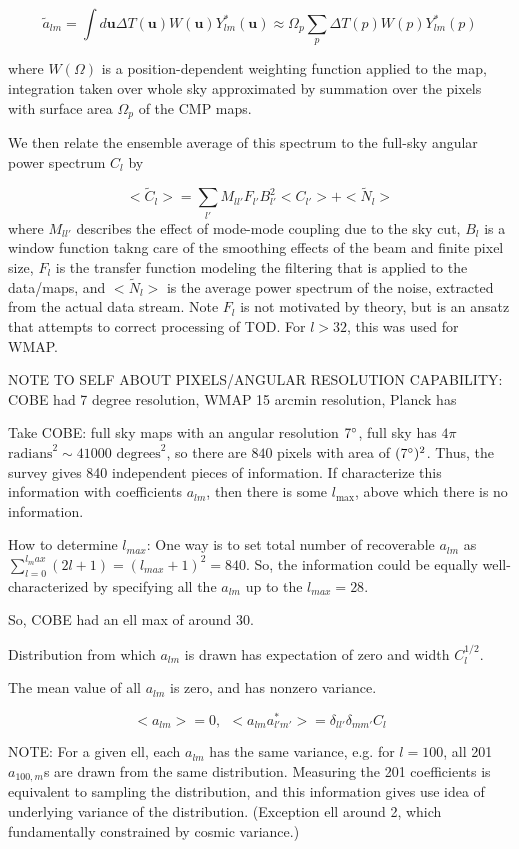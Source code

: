 \documentclass[a4paper, 11pt]{article}
\begin{document}
$$
\tilde{a}_{lm}=\int d\textbf{u} \Delta T(\textbf{u})W(\textbf{u})Y^{*}_{lm}(\textbf{u}) \approx \Omega_p\sum_p  \Delta T(p)W(p)Y^{*}_{lm}(p)
$$

where $W(\Omega)$ is a position-dependent weighting function applied to the map, integration taken over whole sky approximated by summation over the pixels with surface area $\Omega_p$ of the CMP maps. 

We then relate the ensemble average of this spectrum to the full-sky angular power spectrum $C_l$ by 

$$
< \widetilde{C}_l > = \sum_{l'} M_{ll'} F_{l'} B^2_{l'}<C_{l'}> + <\widetilde{N}_l>
$$
where $M_{ll'}$ describes the effect of mode-mode coupling due to the sky cut, $B_l$ is a window function takng care of the smoothing effects of the beam and finite pixel size, $F_l$ is the transfer function modeling the filtering that is applied to the data/maps, and $<\widetilde{N}_l>$ is the average power spectrum of the noise, extracted from the actual data stream. Note $F_l$ is not motivated by theory, but is an ansatz that attempts to correct processing of TOD.  For $l>32$, this was used for WMAP. 

NOTE TO SELF ABOUT PIXELS/ANGULAR RESOLUTION CAPABILITY: COBE had 7 degree resolution, WMAP 15 arcmin resolution, Planck has 

Take COBE: full sky maps with an angular resolution $7\degree$, full sky has $4\pi$ $\text{radians}^2 \sim 41000$ $\text{degrees}^2$, so there are $840$ pixels with area of $(7\degree)^2$. Thus, the survey gives 840 independent pieces of information. If characterize this information with coefficients $a_{lm}$, then there is some $l_{\text{max}}$, above which there is no information. 

How to determine $l_{max}$: One way is to set total number of recoverable $a_{lm}$ as $\sum^{l_max}_{l=0}(2l+1)=(l_{max}+1)^2=840$. So, the information could be equally well-characterized by specifying all the $a_{lm}$ up to the $l_{max}=28$. 

So, COBE had an ell max of around 30. 

Distribution from which $a_{lm}$ is drawn has expectation of zero and width $C_l^{1/2}$. 

The mean value of all $a_{lm}$ is zero, and has nonzero variance. 

$$
<a_{lm}>=0, \ \ <a_{lm}a^{*}_{l'm'}>=\delta_{ll'}\delta_{mm'}C_l
$$

NOTE: For a given ell, each $a_{lm}$ has the same variance, e.g. for $l=100$, all 201 $a_{100,m}$s are drawn from the same distribution. Measuring the 201 coefficients is equivalent to sampling the distribution, and this information gives use idea of underlying variance of the distribution. (Exception ell around 2, which fundamentally constrained by cosmic variance.)
\end{document}
